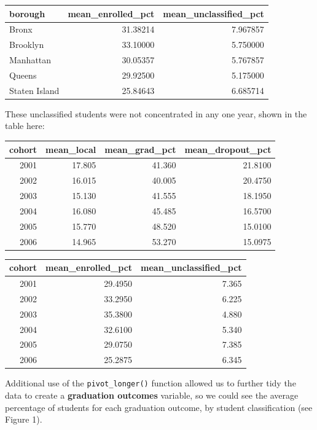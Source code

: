 \documentclass[
  english,
  man, fleqn, noextraspace]{apa6}
\begin{document}
\begin{tabular}{l|r|r}
\hline
borough & mean\_enrolled\_pct & mean\_unclassified\_pct\\
\hline
Bronx & 31.38214 & 7.967857\\
\hline
Brooklyn & 33.10000 & 5.750000\\
\hline
Manhattan & 30.05357 & 5.767857\\
\hline
Queens & 29.92500 & 5.175000\\
\hline
Staten Island & 25.84643 & 6.685714\\
\hline
\end{tabular}

These unclassified students were not concentrated in any one year, shown in the table here:

\begin{tabular}{r|r|r|r}
\hline
cohort & mean\_local & mean\_grad\_pct & mean\_dropout\_pct\\
\hline
2001 & 17.805 & 41.360 & 21.8100\\
\hline
2002 & 16.015 & 40.005 & 20.4750\\
\hline
2003 & 15.130 & 41.555 & 18.1950\\
\hline
2004 & 16.080 & 45.485 & 16.5700\\
\hline
2005 & 15.770 & 48.520 & 15.0100\\
\hline
2006 & 14.965 & 53.270 & 15.0975\\
\hline
\end{tabular}

\begin{tabular}{r|r|r}
\hline
cohort & mean\_enrolled\_pct & mean\_unclassified\_pct\\
\hline
2001 & 29.4950 & 7.365\\
\hline
2002 & 33.2950 & 6.225\\
\hline
2003 & 35.3800 & 4.880\\
\hline
2004 & 32.6100 & 5.340\\
\hline
2005 & 29.0750 & 7.385\\
\hline
2006 & 25.2875 & 6.345\\
\hline
\end{tabular}

Additional use of the \texttt{pivot\_longer()} function allowed us to further tidy the data to create a \textbf{graduation outcomes} variable, so we could see the average percentage of students for each graduation outcome, by student classification (see Figure 1).
\end{document}
